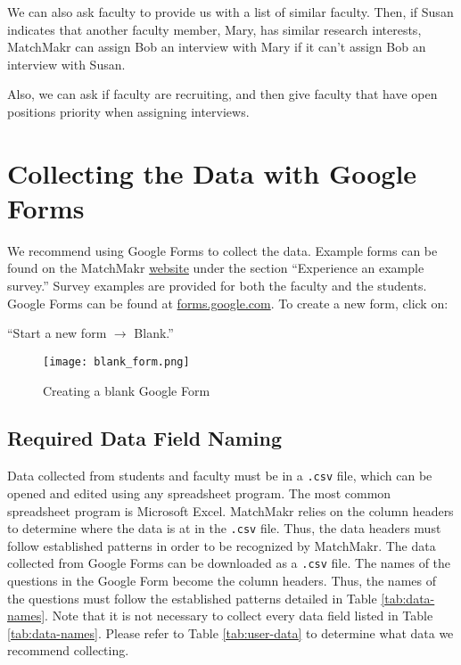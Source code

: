 We can also ask faculty to provide us with a list of similar faculty.  Then, if Susan indicates that another faculty member, Mary, has similar research interests, MatchMakr can assign Bob an interview with Mary if it can't assign Bob an interview with Susan.

Also, we can ask if faculty are recruiting, and then give faculty that have open positions priority when assigning interviews.



\section{Collecting the Data with Google Forms}

We recommend using Google Forms to collect the data.  Example forms can be found on the MatchMakr \href{https://sites.google.com/case.edu/matchmakr/home}{website} under the section ``Experience an example survey.''  Survey examples are provided for both the faculty and the students. Google Forms can be found at \url{forms.google.com}.  To create a new form, click on: \par ``Start a new form $\rightarrow$ Blank.''

\begin{figure}[!h]
	\texttt{[image: blank\_form.png]}
	\caption{\label{fig:blank-form} Creating a blank Google Form}
\end{figure}



%
%
\subsection{Required Data Field Naming}
Data collected from students and faculty must be in a \texttt{.csv} file, which can be opened and edited using any spreadsheet program.  The most common spreadsheet program is Microsoft Excel.  MatchMakr relies on the column headers to determine where the data is at in the \texttt{.csv} file.  Thus, the data headers must follow established patterns in order to be recognized by MatchMakr.  The data collected from Google Forms can be downloaded as a \texttt{.csv} file.  The names of the questions in the Google Form become the column headers.  Thus, the names of the questions must follow the established patterns detailed in Table \ref{tab:data-names}.  Note that it is not necessary to collect every data field listed in Table \ref{tab:data-names}.  Please refer to Table \ref{tab:user-data} to determine what data we recommend collecting.


